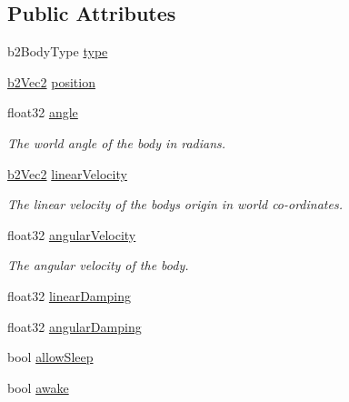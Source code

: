 \subsection*{Public Attributes}
\begin{DoxyCompactItemize}
\item 
b2\+Body\+Type \hyperlink{structb2_body_def_a89cc3ad1873908042b002147b3861381}{type}
\item 
\hyperlink{structb2_vec2}{b2\+Vec2} \hyperlink{structb2_body_def_a680cadc09ad6cf4b3366cbf0914c648b}{position}
\item 
float32 \hyperlink{structb2_body_def_a564b16f4f8e9fcb5dda397e64aa9be6f}{angle}\hypertarget{structb2_body_def_a564b16f4f8e9fcb5dda397e64aa9be6f}{}\label{structb2_body_def_a564b16f4f8e9fcb5dda397e64aa9be6f}

\begin{DoxyCompactList}\small\item\em The world angle of the body in radians. \end{DoxyCompactList}\item 
\hyperlink{structb2_vec2}{b2\+Vec2} \hyperlink{structb2_body_def_a25fa5aa78d93159c344241af95bec2bf}{linear\+Velocity}\hypertarget{structb2_body_def_a25fa5aa78d93159c344241af95bec2bf}{}\label{structb2_body_def_a25fa5aa78d93159c344241af95bec2bf}

\begin{DoxyCompactList}\small\item\em The linear velocity of the body\textquotesingle{}s origin in world co-\/ordinates. \end{DoxyCompactList}\item 
float32 \hyperlink{structb2_body_def_add7809f7a29656b8c4b643ad8c2f34a9}{angular\+Velocity}\hypertarget{structb2_body_def_add7809f7a29656b8c4b643ad8c2f34a9}{}\label{structb2_body_def_add7809f7a29656b8c4b643ad8c2f34a9}

\begin{DoxyCompactList}\small\item\em The angular velocity of the body. \end{DoxyCompactList}\item 
float32 \hyperlink{structb2_body_def_a728f6df3be7dedb331455105e3659d46}{linear\+Damping}
\item 
float32 \hyperlink{structb2_body_def_a01b8dc8ad9f0962efef9e4a8e836feb6}{angular\+Damping}
\item 
bool \hyperlink{structb2_body_def_a0765068172e521ed63cb34084c59c003}{allow\+Sleep}
\item 
bool \hyperlink{structb2_body_def_a17a8102638aac41e7ab94278651a45bd}{awake}\hypertarget{structb2_body_def_a17a8102638aac41e7ab94278651a45bd}{}\label{structb2_body_def_a17a8102638aac41e7ab94278651a45bd}


\end{DoxyCompactItemize}
